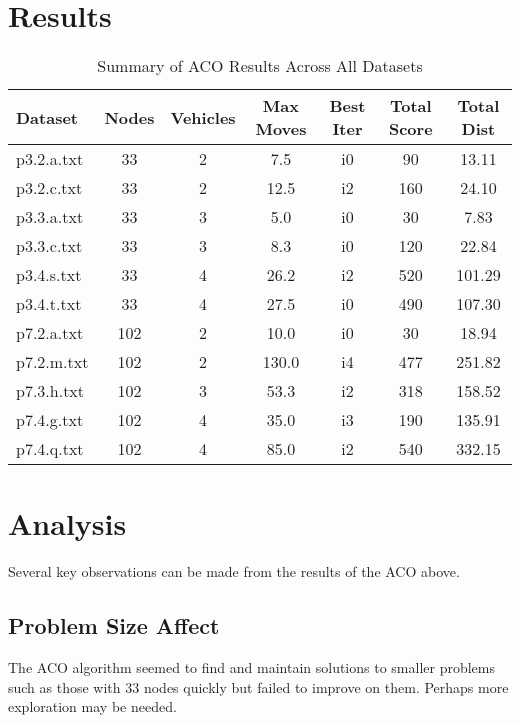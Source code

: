 \documentclass[a4paper,12pt]{article}
\begin{document}
\section{Results}

\begin{table}[htbp]
\centering
\caption{Summary of ACO Results Across All Datasets}
\label{tab:summary}
\begin{tabular}{|l|c|c|c|c|c|c|}
\hline
\textbf{Dataset} & \textbf{Nodes} & \textbf{Vehicles} & \textbf{Max Moves} & \textbf{Best Iter} & \textbf{Total Score} & \textbf{Total Dist} \\
\hline
p3.2.a.txt & 33 & 2 & 7.5 & i0 & 90 & 13.11 \\
\hline
p3.2.c.txt & 33 & 2 & 12.5 & i2 & 160 & 24.10 \\
\hline
p3.3.a.txt & 33 & 3 & 5.0 & i0 & 30 & 7.83 \\
\hline
p3.3.c.txt & 33 & 3 & 8.3 & i0 & 120 & 22.84 \\
\hline
p3.4.s.txt & 33 & 4 & 26.2 & i2 & 520 & 101.29 \\
\hline
p3.4.t.txt & 33 & 4 & 27.5 & i0 & 490 & 107.30 \\
\hline
p7.2.a.txt & 102 & 2 & 10.0 & i0 & 30 & 18.94 \\
\hline
p7.2.m.txt & 102 & 2 & 130.0 & i4 & 477 & 251.82 \\
\hline
p7.3.h.txt & 102 & 3 & 53.3 & i2 & 318 & 158.52 \\
\hline
p7.4.g.txt & 102 & 4 & 35.0 & i3 & 190 & 135.91 \\
\hline
p7.4.q.txt & 102 & 4 & 85.0 & i2 & 540 & 332.15 \\
\hline
\end{tabular}
\end{table}

\clearpage
\section{Analysis}

Several key observations can be made from the results of the ACO above.

\subsection{Problem Size Affect}

The ACO algorithm seemed to find and maintain solutions to smaller problems such as those with 33 nodes quickly but failed to improve on them. Perhaps more exploration may be needed.
\end{document}
